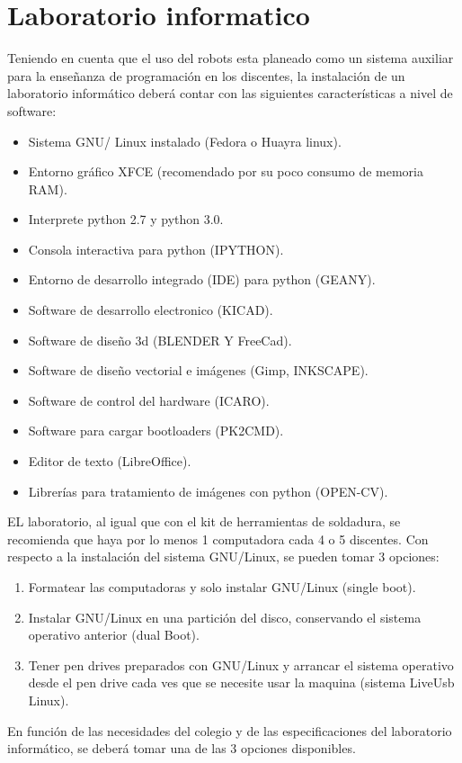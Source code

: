 \section{Laboratorio informatico}

Teniendo en cuenta que el uso del robots esta planeado como un sistema auxiliar para la enseñanza de programación en los discentes, la instalación de un laboratorio informático deberá contar con las siguientes características a nivel de software:

\begin{itemize}
  \item Sistema GNU/ Linux instalado (Fedora o Huayra linux).
  \item Entorno gráfico XFCE (recomendado por su poco consumo de memoria RAM).
  \item Interprete python 2.7 y python 3.0.
  \item Consola interactiva para python (IPYTHON).
  \item Entorno de desarrollo integrado (IDE) para python (GEANY).
  \item Software de desarrollo electronico (KICAD).
  \item Software de diseño 3d (BLENDER Y FreeCad).
  \item Software de diseño vectorial e imágenes (Gimp, INKSCAPE).
  \item Software de control del hardware (ICARO).
  \item Software para cargar bootloaders (PK2CMD).
  \item Editor de texto (LibreOffice).
  \item Librerías para tratamiento de imágenes con python (OPEN-CV).
\end{itemize}

EL laboratorio, al igual que con el kit de herramientas de soldadura, se recomienda que haya por lo menos 1 computadora cada 4 o 5 discentes. Con respecto a la instalación del sistema GNU/Linux, se pueden tomar 3 opciones:

\begin{enumerate}
  \item Formatear las computadoras y solo instalar GNU/Linux (single boot).
  \item Instalar GNU/Linux en una partición del disco, conservando el sistema operativo anterior (dual Boot).
  \item Tener pen drives preparados con GNU/Linux y arrancar el sistema operativo desde el pen drive cada ves que se necesite usar la maquina (sistema LiveUsb Linux).
\end{enumerate}

En función de las necesidades del colegio y de las especificaciones del laboratorio informático, se deberá tomar una de las 3 opciones disponibles.


 
